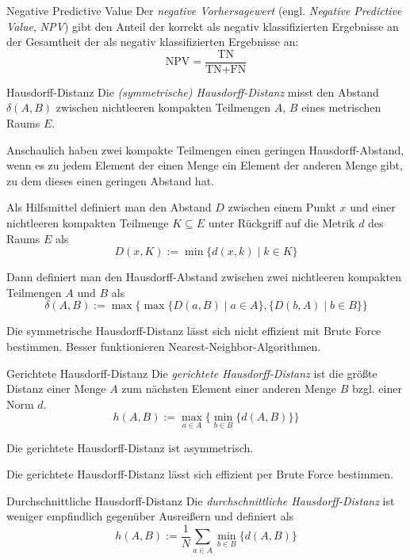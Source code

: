 \begin{defi}[Überlappungsmetrik]{Negative Predictive Value}
    Der \emph{negative Vorhersagewert} (engl. \emph{Negative Predictive Value}, \emph{NPV}) gibt den Anteil der korrekt als negativ klassifizierten Ergebnisse an der Gesamtheit der als negativ klassifizierten Ergebnisse an:
    \[
        \text{NPV} = \frac{\text{TN}}{\text{TN} + \text{FN}}
    \]
\end{defi}

\begin{defi}[Entfernungsmetrik]{Hausdorff-Distanz}
    Die \emph{(symmetrische) Hausdorff-Distanz} misst den Abstand $\delta(A, B)$ zwischen nichtleeren kompakten Teilmengen $A$, $B$ eines metrischen Raums $E$.

    Anschaulich haben zwei kompakte Teilmengen einen geringen Hausdorff-Abstand, wenn es zu jedem Element der einen Menge ein Element der anderen Menge gibt, zu dem dieses einen geringen Abstand hat.

    Als Hilfsmittel definiert man den Abstand $D$ zwischen einem Punkt $x$ und einer nichtleeren kompakten Teilmenge $K \subseteq E$ unter Rückgriff auf die Metrik $d$ des Raums $E$ als
    \[
        D(x, K) := \min \{ d(x, k) \mid k \in K \}
    \]

    Dann definiert man den Hausdorff-Abstand zwischen zwei nichtleeren kompakten Teilmengen $A$ und $B$ als
    \[
        \delta(A, B) := \max \{ \max \{ D(a, B) \mid a \in A \}, \{ D(b, A) \mid b \in B \} \}
    \]

    Die symmetrische Hausdorff-Distanz lässt sich nicht effizient mit Brute Force bestimmen.
    Besser funktionieren Nearest-Neighbor-Algorithmen.
\end{defi}

\begin{defi}{Gerichtete Hausdorff-Distanz}
    Die \emph{gerichtete Hausdorff-Distanz} ist die größte Distanz einer Menge $A$ zum nächsten Element einer anderen Menge $B$ bzgl. einer Norm $d$.
    \[
        h(A, B) := \max_{a \in A} \{ \min_{b \in B} \{ d(A, B) \}  \}
    \]

    Die gerichtete Hausdorff-Distanz ist asymmetrisch.

    Die gerichtete Hausdorff-Distanz lässt sich effizient per Brute Force bestimmen.
\end{defi}

\begin{defi}{Durchschnittliche Hausdorff-Distanz}
    Die \emph{durchschnittliche Hausdorff-Distanz} ist weniger empfindlich gegenüber Ausreißern und definiert als
    \[
        h(A, B) := \frac{1}{N} \sum_{a \in A} \min_{b \in B} \{ d(A, B) \}
    \]
\end{defi}